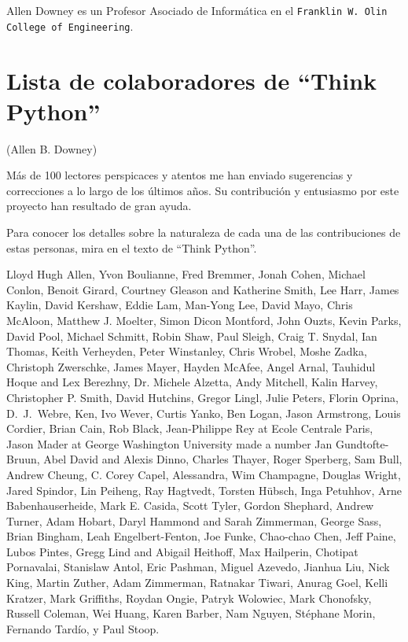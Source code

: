 Allen Downey es un Profesor Asociado de Informática en
el {\tt Franklin W. Olin College of Engineering}.

\section*{Lista de colaboradores de ``Think Python''}


(Allen B. Downey)

Más de 100 lectores perspicaces y atentos me han enviado
sugerencias y correcciones a lo largo de los últimos años. Su
contribución y entusiasmo por este proyecto han resultado de
gran ayuda.

Para conocer los detalles sobre la naturaleza de cada una de las contribuciones
de estas personas, mira en el texto de ``Think Python''.

Lloyd Hugh Allen,
Yvon Boulianne,
Fred Bremmer,
Jonah Cohen,
Michael Conlon,
Benoit Girard,
Courtney Gleason and Katherine Smith,
Lee Harr,
James Kaylin,
David Kershaw,
Eddie Lam,
Man-Yong Lee,
David Mayo,
Chris McAloon,
Matthew J. Moelter,
Simon Dicon Montford,
John Ouzts,
Kevin Parks,
David Pool,
Michael Schmitt,
Robin Shaw,
Paul Sleigh,
Craig T. Snydal,
Ian Thomas,
Keith Verheyden,
Peter Winstanley,
Chris Wrobel,
Moshe Zadka,
Christoph Zwerschke,
James Mayer,
Hayden McAfee,
Angel Arnal,
Tauhidul Hoque and Lex Berezhny,
Dr. Michele Alzetta,
Andy Mitchell,
Kalin Harvey,
Christopher P. Smith,
David Hutchins,
Gregor Lingl,
Julie Peters,
Florin Oprina,
D.~J.~Webre,
Ken,
Ivo Wever,
Curtis Yanko,
Ben Logan,
Jason Armstrong,
Louis Cordier,
Brian Cain,
Rob Black,
Jean-Philippe Rey at Ecole Centrale Paris,
Jason Mader at George Washington University made a number
Jan Gundtofte-Bruun,
Abel David and Alexis Dinno,
Charles Thayer,
Roger Sperberg,
Sam Bull,
Andrew Cheung,
C. Corey Capel,
Alessandra,
Wim Champagne,
Douglas Wright,
Jared Spindor,
Lin Peiheng,
Ray Hagtvedt,
Torsten H\"{u}bsch,
Inga Petuhhov,
Arne Babenhauserheide,
Mark E. Casida,
Scott Tyler,
Gordon Shephard,
Andrew Turner,
Adam Hobart,
Daryl Hammond and Sarah Zimmerman,
George Sass,
Brian Bingham,
Leah Engelbert-Fenton,
Joe Funke,
Chao-chao Chen,
Jeff Paine,
Lubos Pintes,
Gregg Lind and Abigail Heithoff,
Max Hailperin,
Chotipat Pornavalai,
Stanislaw Antol,
Eric Pashman,
Miguel Azevedo,
Jianhua Liu,
Nick King,
Martin Zuther,
Adam Zimmerman,
Ratnakar Tiwari,
Anurag Goel,
Kelli Kratzer,
Mark Griffiths,
Roydan Ongie,
Patryk Wolowiec,
Mark Chonofsky,
Russell Coleman,
Wei Huang,
Karen Barber,
Nam Nguyen,
St\'{e}phane Morin,
Fernando Tard\'{i}o,
y
Paul Stoop.

